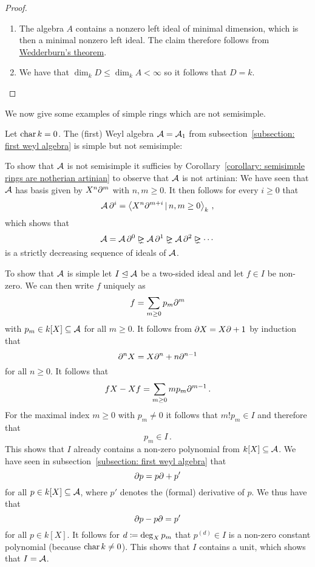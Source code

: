 \begin{proof}
  \leavevmode
  \begin{enumerate}
    \item
      The algebra $A$ contains a nonzero left ideal of minimal dimension, which is then a minimal nonzero left ideal.
      The claim therefore follows from \hyperref[theorem: wedderburns theorem]{Wedderburn’s theorem}.
    \item
      We have that $\dim_k D \leq \dim_k A < \infty$ so it follows that $D = k$.
    \qedhere
  \end{enumerate}
\end{proof}

\begin{fluff}
  We now give some examples of simple rings which are not semisimple.
\end{fluff}


\begin{example}
  \label{example: simple but not semisimple}
  Let $\operatorname{char} k = 0$.
  The (first) Weyl algebra $\operatorname{\mathcal{A}} = \operatorname{\mathcal{A}}_1$ from subsection~\ref{subsection: first weyl algebra} is simple but not semisimple:
  
  To show that $\operatorname{\mathcal{A}}$ is not semisimple it sufficies by Corollary~\ref{corollary: semisimple rings are notherian artinian} to observe that $\operatorname{\mathcal{A}}$ is not artinian:
  We have seen that $\operatorname{\mathcal{A}}$ has basis given by $X^n \partial^m$ with $n, m \geq 0$.
  It then follows for every $i \geq 0$ that
  \[
      \weyl \del^i
    = \gen{ X^n \del^{m+i} \suchthat n, m \geq 0 }_k \,,
  \]
  which shows that
  \[
                \weyl
    =           \weyl \del^0
    \idealgneq  \weyl \del^1
    \idealgneq  \weyl \del^2
    \idealgneq  \dotsb
  \]
  is a strictly decreasing sequence of ideals of $\operatorname{\mathcal{A}}$.
  
  To show that $\operatorname{\mathcal{A}}$ is simple let $I \trianglelefteq \operatorname{\mathcal{A}}$ be a two-sided ideal and let $f \in I$ be non-zero.
  We can then write $f$ uniquely as
  \[
      f
    = \sum_{m \geq 0} p_m \partial^m
  \]
  with $p_m \in k[X] \subseteq \operatorname{\mathcal{A}}$ for all $m \geq 0$.
  It follows from $\partial X = X \partial + 1$ by induction that 
  \[
      \partial^n X
    = X \partial^n + n \partial^{n-1}
  \]
  for all $n \geq 0$.
  It follows that
  \[
      f X - X f
    = \sum_{m \geq 0} m p_m \partial^{m-1} \,.
  \]
  For the maximal index $m \geq 0$ with $p_m \neq 0$ it follows that $m! p_m \in I$ and therefore that
  \[
    p_m \in I \,.
  \]
  This shows that $I$ already contains a non-zero polynomial from $k[X] \subseteq \operatorname{\mathcal{A}}$.
  We have seen in subsection~\ref{subsection: first weyl algebra} that
  \[
    \partial p = p \partial + p'
  \]
  for all $p \in k[X] \subseteq \operatorname{\mathcal{A}}$, where $p'$ denotes the (formal) derivative of $p$.
  We thus have that
  \[
      \partial p - p \partial
    = p'
  \]
  for all $p \in k[X]$.
  It follows for $d \coloneqq \deg_X p_m$ that $p^{(d)} \in I$ is a non-zero constant polynomial (because $\operatorname{char} k \neq 0$).
  This shows that $I$ contains a unit, which shows that $I = \operatorname{\mathcal{A}}$.
\end{example}


